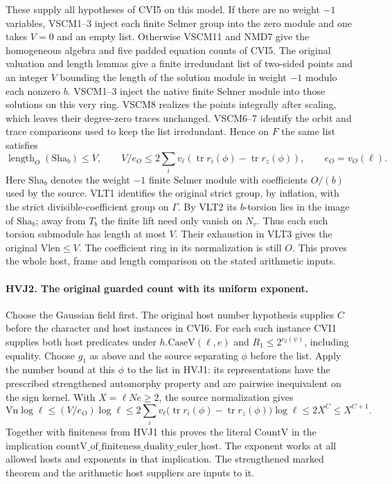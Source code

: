 These supply all hypotheses of CVI5 on this model. If there are no
weight $-1$ variables, VSCM1--3 inject each finite Selmer group into
the zero module and one takes $V=0$ and an empty list. Otherwise VSCM11
and NMD7 give the homogeneous algebra and five padded equation counts
of CVI5. The original valuation and length lemmas give a finite
irredundant list of two-sided points and an integer $V$ bounding the
length of the solution module in weight $-1$ modulo each nonzero $b$.
VSCM1--3 inject the native finite Selmer module into those solutions
on this very ring. VSCM8 realizes the points integrally after scaling,
which leaves their degree-zero traces unchanged. VSCM6--7 identify the
orbit and trace comparisons used to keep the list irredundant.
Hence on $F$ the same list satisfies
\[
  \operatorname{length}_O(\mathrm{Sha}_b)\le V,\qquad
  V/e_O\le2\sum_i v_\ell\!\left(
    \operatorname{tr} r_i(\phi)-\operatorname{tr}r_z(\phi)\right),
  \qquad e_O=v_O(\ell).
\]
Here $\mathrm{Sha}_b$ denotes the weight $-1$ finite Selmer module
with coefficients $O/(b)$ used by the source. VLT1 identifies the
original strict group, by inflation, with the strict divisible-coefficient
group on $\Gamma$. By VLT2 its $b$-torsion lies in the image of
$\mathrm{Sha}_b$; away from $T_b$ the finite lift need only vanish on
$N_v$. Thus each such torsion submodule has length at most $V$.
Their exhaustion in VLT3 gives the original $\mathrm{Vlen}\le V$. The coefficient ring in its normalization is
still $O$. This proves the whole host, frame and length comparison
on the stated arithmetic inputs.

\paragraph{HVJ2. The original guarded count with its uniform exponent.}
Choose the Gaussian field first. The original host number hypothesis
supplies $C$ before the character and host instances in CVI6.
For each such instance CVI1 supplies both host predicates under
$h.\mathrm{CaseV}(\ell,e)$ and $R_1\le 2^{c_2(\psi)}$, including
equality. Choose $g_1$ as above and the source separating $\phi$ before
the list. Apply the number bound at this $\phi$ to the list in HVJ1:
its representations have the prescribed strengthened automorphy
property and are pairwise inequivalent on the sign kernel. With
$X=\ell N e\ge2$, the source normalization gives
\[
 \mathrm{Vn}\log\ell
 \le (V/e_O)\log\ell
 \le 2\sum_i v_\ell\bigl(\operatorname{tr}r_i(\phi)
                      -\operatorname{tr}r_z(\phi)\bigr)\log\ell
 \le 2X^C\le X^{C+1}.
\]
Together with finiteness from HVJ1 this proves the literal
$\mathrm{CountV}$ in the implication
$\mathrm{countV\_of\_finiteness\_duality\_euler\_host}$.
The exponent works at all allowed hosts and exponents in that implication.
The strengthened marked theorem and the arithmetic host suppliers are
inputs to it.
